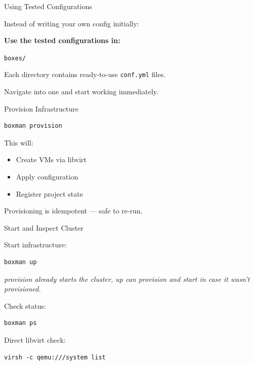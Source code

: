 \documentclass[aspectratio=169]{beamer}
\begin{document}
\begin{frame}{Using Tested Configurations}

Instead of writing your own config initially:

\medskip

\textbf{Use the tested configurations in:}

\begin{center}
\texttt{boxes/}
\end{center}

Each directory contains ready-to-use \texttt{conf.yml} files.

\medskip

Navigate into one and start working immediately.

\end{frame}


\begin{frame}[fragile]{Provision Infrastructure}

\begin{lstlisting}
boxman provision
\end{lstlisting}

This will:
\begin{itemize}
    \item Create VMs via libvirt
    \item Apply configuration
    \item Register project state
\end{itemize}

Provisioning is idempotent — safe to re-run.

\end{frame}


\begin{frame}[fragile]{Start and Inspect Cluster}

Start infrastructure:

\begin{lstlisting}
boxman up
\end{lstlisting}
\vspace{-0.4em}
{\footnotesize\color{black!60}\textit{provision already starts the cluster, up can provision and start in case it wasn't provisioned.}}

Check status:

\begin{lstlisting}
boxman ps
\end{lstlisting}

Direct libvirt check:

\begin{lstlisting}
virsh -c qemu:///system list
\end{lstlisting}

\end{frame}
\end{document}
